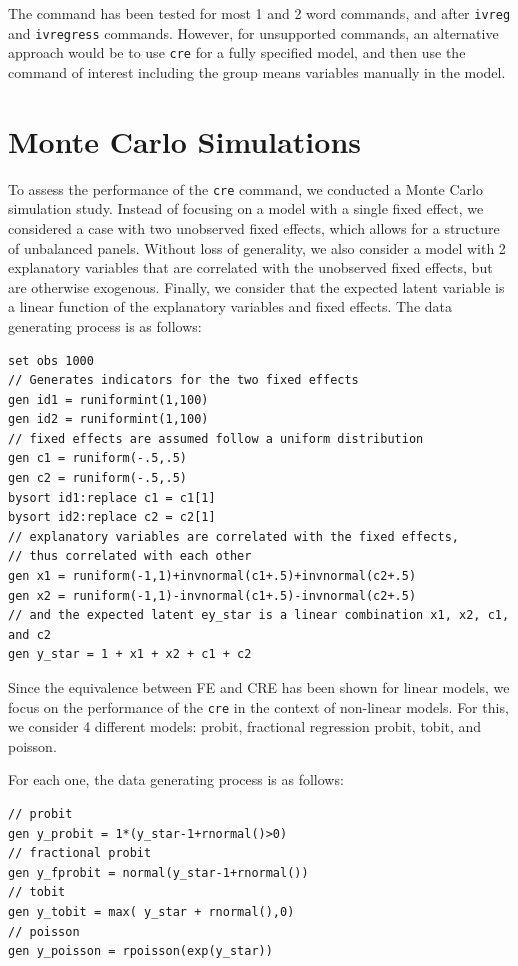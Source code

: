 \documentclass[bib]{statapress}
\begin{document}
The command has been tested for most 1 and 2 word commands, and after
\texttt{ivreg} and \texttt{ivregress} commands. However, for unsupported
commands, an alternative approach would be to use \texttt{cre} for a
fully specified model, and then use the command of interest including
the group means variables manually in the model.

\section{Monte Carlo Simulations}\label{sec-4}

To assess the performance of the \texttt{cre} command, we conducted a
Monte Carlo simulation study. Instead of focusing on a model with a
single fixed effect, we considered a case with two unobserved fixed
effects, which allows for a structure of unbalanced panels. Without loss
of generality, we also consider a model with 2 explanatory variables
that are correlated with the unobserved fixed effects, but are otherwise
exogenous. Finally, we consider that the expected latent variable is a
linear function of the explanatory variables and fixed effects. The data
generating process is as follows:

\begin{verbatim}
set obs 1000
// Generates indicators for the two fixed effects
gen id1 = runiformint(1,100)
gen id2 = runiformint(1,100)
// fixed effects are assumed follow a uniform distribution
gen c1 = runiform(-.5,.5)
gen c2 = runiform(-.5,.5)
bysort id1:replace c1 = c1[1]
bysort id2:replace c2 = c2[1] 
// explanatory variables are correlated with the fixed effects, 
// thus correlated with each other
gen x1 = runiform(-1,1)+invnormal(c1+.5)+invnormal(c2+.5)
gen x2 = runiform(-1,1)-invnormal(c1+.5)-invnormal(c2+.5)
// and the expected latent ey_star is a linear combination x1, x2, c1, and c2
gen y_star = 1 + x1 + x2 + c1 + c2
\end{verbatim}

Since the equivalence between FE and CRE has been shown for linear
models, we focus on the performance of the \texttt{cre} in the context
of non-linear models. For this, we consider 4 different models: probit,
fractional regression probit, tobit, and poisson.

For each one, the data generating process is as follows:

\begin{verbatim}
// probit
gen y_probit = 1*(y_star-1+rnormal()>0)
// fractional probit
gen y_fprobit = normal(y_star-1+rnormal())
// tobit
gen y_tobit = max( y_star + rnormal(),0)
// poisson
gen y_poisson = rpoisson(exp(y_star))
\end{verbatim}
\end{document}
